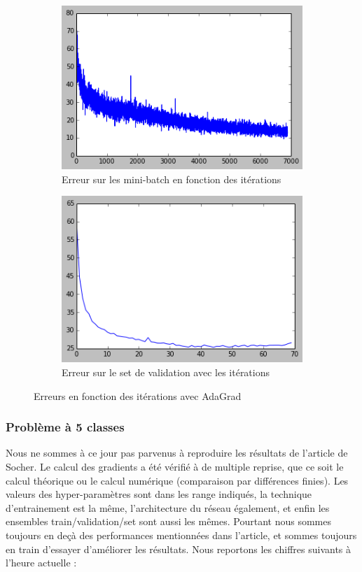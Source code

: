 \documentclass[conference]{IEEEtran}
\begin{document}
\begin{figure}[h]
\begin{subfigure}{0.48\columnwidth}
\includegraphics[width=\textwidth]{fig/AdaGradLastTrainMbe.png}
\caption{Erreur sur les mini-batch en fonction des itérations}
\end{subfigure}
\begin{subfigure}{0.48\columnwidth}
\includegraphics[width=\textwidth]{fig/AdaGradLastTrainVal.png}
\caption{Erreur sur le set de validation avec les itérations}
\end{subfigure}
\caption{Erreurs en fonction des itérations avec AdaGrad}
\label{FinErreur}
\end{figure}

\subsubsection{Problème à 5 classes}
Nous ne sommes à ce jour pas parvenus à reproduire les résultats de l'article de Socher. Le calcul des gradients a été vérifié à de multiple reprise, que ce soit le calcul théorique ou le calcul numérique (comparaison par différences finies). Les valeurs des hyper-paramètres sont dans les range indiqués, la technique d'entrainement est la même, l'architecture du réseau également, et enfin les ensembles train/validation/set sont aussi les mêmes. Pourtant nous sommes toujours en deçà des performances mentionnées dans l'article, et sommes toujours en train d'essayer d'améliorer les résultats. Nous reportons les chiffres suivants à l'heure actuelle :
\end{document}
